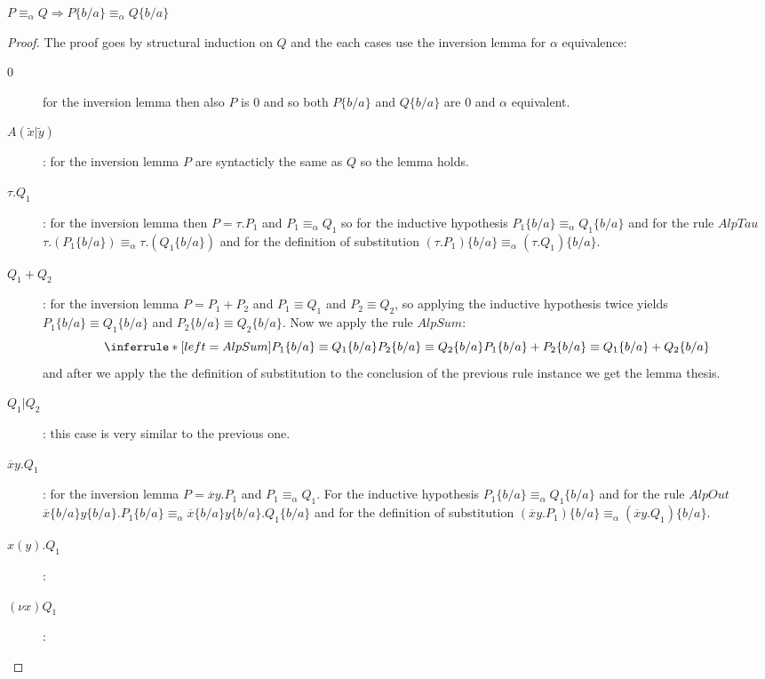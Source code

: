 \begin{lemma}
  $P\equiv_{\alpha}Q\Rightarrow P\{b/a\}\equiv_{\alpha}Q\{b/a\}$
  \begin{proof}
    The proof goes by structural induction on $Q$ and the each cases use the inversion lemma for $\alpha$ equivalence:
	\begin{description}
	  \item[$0$]
	    for the inversion lemma then also $P$ is $0$ and so both $P\{b/a\}$ and $Q\{b/a\}$ are $0$ and $\alpha$ equivalent.
	  \item[$A(\tilde{x}|\tilde{y})$]:
	    for the inversion lemma $P$ are syntacticly the same as $Q$ so the lemma holds.
	  \item[$\tau.Q_{1}$]:
	    for the inversion lemma then $P=\tau.P_{1}$ and $P_{1}\equiv_{\alpha}Q_{1}$ so for the inductive hypothesis $P_{1}\{b/a\}\equiv_{\alpha}Q_{1}\{b/a\}$ and for the rule $AlpTau$ $\tau.(P_{1}\{b/a\})\equiv_{\alpha}\tau.(Q_{1}\{b/a\})$ and for the definition of substitution $(\tau.P_{1})\{b/a\}\equiv_{\alpha}(\tau.Q_{1})\{b/a\}$.
	  \item[$Q_{1}+Q_{2}$]:
	    for the inversion lemma $P=P_{1}+P_{2}$ and $P_{1}\equiv Q_{1}$ and $P_{2}\equiv Q_{2}$, so applying the inductive hypothesis twice yields $P_{1}\{b/a\}\equiv Q_{1}\{b/a\}$ and $P_{2}\{b/a\}\equiv Q_{2}\{b/a\}$. Now we apply the rule $AlpSum$:
	    \[
	      \inferrule* [left=AlpSum]{
		  P_{1}\{b/a\}\equiv Q_{1}\{b/a\}
		\\
		  P_{2}\{b/a\}\equiv Q_{2}\{b/a\}
	      }{
		  P_{1}\{b/a\}+P_{2}\{b/a\}\equiv Q_{1}\{b/a\}+Q_{2}\{b/a\}
	      }
	    \]
	    and after we apply the the definition of substitution to the conclusion of the previous rule instance we get the lemma thesis.
	  \item[$Q_{1}|Q_{2}$]:
	    this case is very similar to the previous one.
	  \item[$\overline{x}y.Q_{1}$]:
	    for the inversion lemma $P=\overline{x}y.P_{1}$ and $P_{1}\equiv_{\alpha}Q_{1}$. For the inductive hypothesis $P_{1}\{b/a\}\equiv_{\alpha}Q_{1}\{b/a\}$ and for the rule $AlpOut$ $\overline{x}\{b/a\}y\{b/a\}.P_{1}\{b/a\}\equiv_{\alpha}\overline{x}\{b/a\}y\{b/a\}.Q_{1}\{b/a\}$ and for the definition of substitution $(\overline{x}y.P_{1})\{b/a\}\equiv_{\alpha}(\overline{x}y.Q_{1})\{b/a\}$.
	  \item[$x(y).Q_{1}$]:
	    
	  \item[$(\nu x)Q_{1}$]:
	    
	\end{description}
  \end{proof}
\end{lemma}


